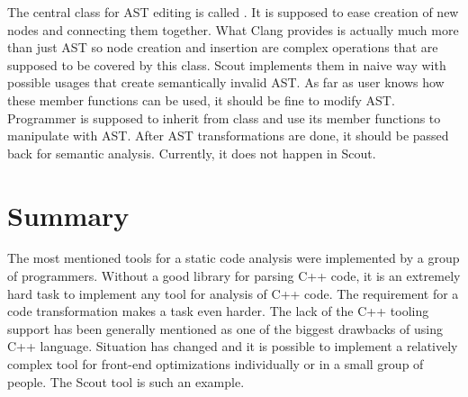 The central class for AST editing is called . It is supposed to ease creation of new nodes and connecting them together. What Clang provides is actually much more than just AST so node creation and insertion are complex operations that are supposed to be covered by this class. Scout implements them in naive way with possible usages that create semantically invalid AST. As far as user knows how these member functions can be used, it should be fine to modify AST. Programmer is supposed to inherit from  class and use its member functions to manipulate with AST. After AST transformations are done, it should be passed back for semantic analysis. Currently, it does not happen in Scout.

\section{Summary}
The most mentioned tools for a static code analysis were implemented by a group of programmers. Without a good library for parsing C++ code, it is an extremely hard task to implement any tool for analysis of C++ code. The requirement for a code transformation makes a task even harder. The lack of the C++ tooling support has been generally mentioned as one of the biggest drawbacks of using C++ language. Situation has changed and it is possible to implement a relatively complex tool for front-end optimizations individually or in a small group of people. The Scout tool is such an example.